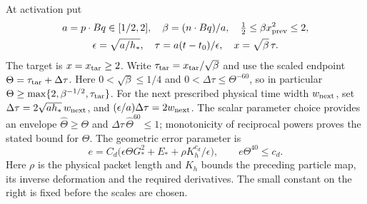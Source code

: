 \documentclass[11pt]{article}
\theoremstyle{definition}
\begin{document}
At activation put
\begin{gather*}
 a=p\cdot Bq\in[1/2,2],\quad \beta=(n\cdot Bq)/a,
 \quad \tfrac12\leq\beta x_{\rm prev}^2\leq2,\\
 \epsilon=\sqrt{a/h_*},\quad
 \tau=a(t-t_0)/\epsilon,\quad x=\sqrt\beta\,\tau.
\end{gather*}
The target is $x=x_{\rm tar}\geq2$. Write
$\tau_{\rm tar}=x_{\rm tar}/\sqrt\beta$ and use the scaled endpoint
$\Theta=\tau_{\rm tar}+\Delta\tau$. Here $0<\sqrt\beta\leq1/4$ and
$0<\Delta\tau\leq\Theta^{-60}$, so in particular
$\Theta\geq\max\{2,\beta^{-1/2},\tau_{\rm tar}\}$.
For the next prescribed physical time width $w_{\rm next}$, set
$\Delta\tau=2\sqrt{a h_*}\,w_{\rm next}$, and
$(\epsilon/a)\Delta\tau=2w_{\rm next}$.
The scalar parameter choice provides an envelope $\widehat\Theta\geq\Theta$
and $\Delta\tau\,\widehat\Theta^{60}\leq1$; monotonicity of reciprocal
powers proves the stated bound for $\Theta$.
The geometric error parameter is
\begin{equation}\label{eq:geometric-error}
 e=C_d\bigl(\epsilon\Theta G_*^2+E_*+
                   \rho K_h^{c_d}/\epsilon\bigr),
 \qquad e\Theta^{40}\leq c_d.
\end{equation}
Here $\rho$ is the physical packet length and $K_h$ bounds the
preceding particle map, its inverse deformation and the required derivatives.
The small constant on the right is fixed before the scales are chosen.
\end{document}
